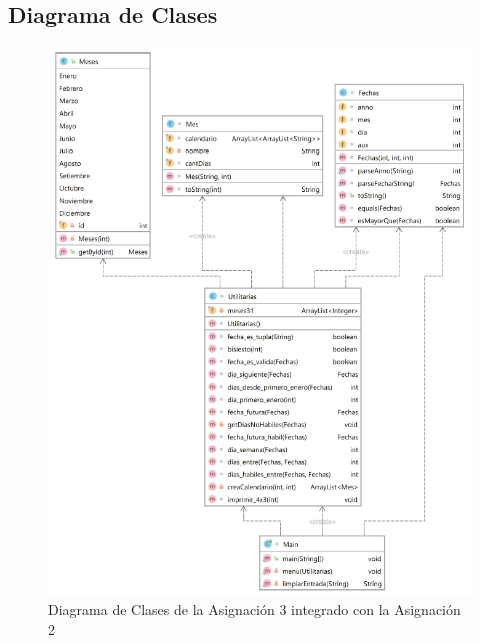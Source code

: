\documentclass[10pt,journal,compsoc]{IEEEtran}
\begin{document}
\subsection{Diagrama de Clases}
\begin{figure}[H]
	\centering
	\includegraphics[width=\linewidth]{diagramaClases.png}
	\caption{Diagrama de Clases de la Asignación 3 integrado con la Asignación 2}
\end{figure}
	
\end{document}
